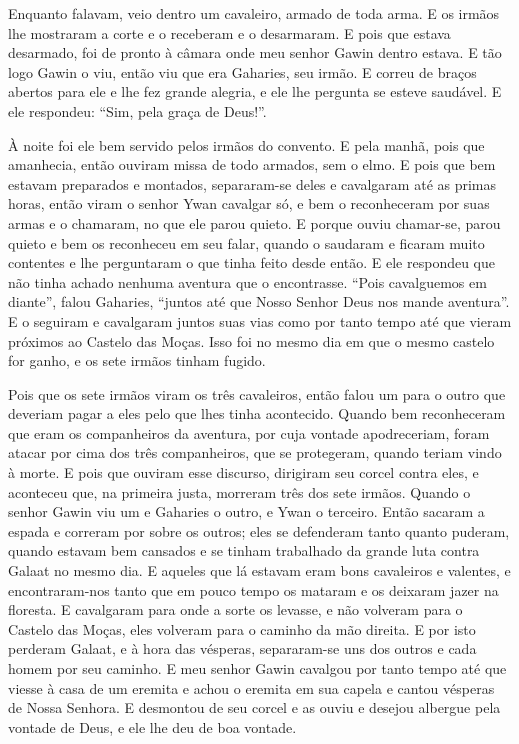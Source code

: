 Enquanto falavam, veio dentro um cavaleiro, armado de toda arma. E os irmãos lhe
mostraram a corte e o receberam e o desarmaram. E pois que estava desarmado,
foi de pronto à câmara onde meu senhor Gawin  dentro estava. E tão logo
Gawin o viu, então viu que era Gaharies, seu irmão. E correu de braços abertos
para ele e lhe fez grande alegria, e ele lhe pergunta se esteve saudável. E ele
respondeu: “Sim, pela graça de Deus!”. 

À noite foi ele bem servido pelos irmãos do convento. E pela manhã, pois que
amanhecia, então ouviram missa de todo armados, sem o elmo. E pois que bem
estavam preparados e montados, separaram-se deles e cavalgaram até as primas
horas, então viram o senhor Ywan cavalgar só, e bem o reconheceram por suas
armas e o chamaram, no que ele parou quieto. E porque ouviu chamar-se, parou
quieto e bem os reconheceu em seu falar, quando o saudaram e ficaram muito
contentes e lhe perguntaram o que tinha feito desde então. E ele respondeu que
não tinha achado nenhuma aventura que o encontrasse. “Pois cavalguemos em
diante”, falou Gaharies, “juntos até que Nosso Senhor Deus nos mande aventura”.
E o seguiram e cavalgaram juntos suas vias como por tanto tempo até que vieram
próximos ao Castelo das Moças. Isso foi no mesmo dia em que o mesmo castelo for
ganho, e os sete irmãos tinham fugido. 

Pois que os sete irmãos viram os três cavaleiros, então falou um para o outro
que deveriam pagar a eles pelo que lhes tinha acontecido. Quando bem
reconheceram que eram os companheiros da aventura, por cuja vontade
apodreceriam, foram atacar por cima dos três companheiros, que se protegeram,
quando teriam vindo à morte. E pois que ouviram esse discurso, dirigiram seu
corcel contra eles, e aconteceu que, na primeira justa, morreram três dos sete
irmãos. Quando o senhor Gawin viu um e Gaharies o outro, e Ywan o terceiro.
Então sacaram a espada e correram por sobre os outros; eles se defenderam tanto
quanto puderam, quando estavam bem cansados e se tinham trabalhado da grande
luta contra Galaat no mesmo dia. E aqueles que lá estavam eram bons cavaleiros
e valentes, e encontraram-nos tanto que em pouco tempo os mataram e os deixaram
jazer na floresta. E cavalgaram para onde a sorte os levasse, e não volveram
para o Castelo das Moças, eles volveram para o caminho da mão direita. E por
isto perderam Galaat, e à hora das vésperas, separaram-se uns dos outros e cada
homem por seu caminho. E meu senhor Gawin  cavalgou por tanto tempo até
que viesse à casa de um eremita e achou o eremita em sua capela e cantou
vésperas de Nossa Senhora. E desmontou de seu corcel e as ouviu e desejou
albergue pela vontade de Deus, e ele lhe deu de boa vontade.

